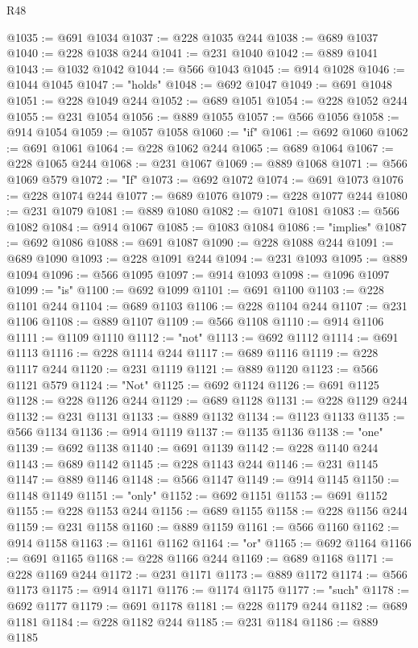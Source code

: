 \begin{lexlean}{R48}
\begin{coremodule}
@1035 := @691 @1034
@1037 := @228 @1035 @244
@1038 := @689 @1037
@1040 := @228 @1038 @244
@1041 := @231 @1040
@1042 := @889 @1041
@1043 := @1032 @1042
@1044 := @566 @1043
@1045 := @914 @1028
@1046 := @1044 @1045
@1047 := "holds"
@1048 := @692 @1047
@1049 := @691 @1048
@1051 := @228 @1049 @244
@1052 := @689 @1051
@1054 := @228 @1052 @244
@1055 := @231 @1054
@1056 := @889 @1055
@1057 := @566 @1056
@1058 := @914 @1054
@1059 := @1057 @1058
@1060 := "if"
@1061 := @692 @1060
@1062 := @691 @1061
@1064 := @228 @1062 @244
@1065 := @689 @1064
@1067 := @228 @1065 @244
@1068 := @231 @1067
@1069 := @889 @1068
@1071 := @566 @1069 @579
@1072 := "If"
@1073 := @692 @1072
@1074 := @691 @1073
@1076 := @228 @1074 @244
@1077 := @689 @1076
@1079 := @228 @1077 @244
@1080 := @231 @1079
@1081 := @889 @1080
@1082 := @1071 @1081
@1083 := @566 @1082
@1084 := @914 @1067
@1085 := @1083 @1084
@1086 := "implies"
@1087 := @692 @1086
@1088 := @691 @1087
@1090 := @228 @1088 @244
@1091 := @689 @1090
@1093 := @228 @1091 @244
@1094 := @231 @1093
@1095 := @889 @1094
@1096 := @566 @1095
@1097 := @914 @1093
@1098 := @1096 @1097
@1099 := "is"
@1100 := @692 @1099
@1101 := @691 @1100
@1103 := @228 @1101 @244
@1104 := @689 @1103
@1106 := @228 @1104 @244
@1107 := @231 @1106
@1108 := @889 @1107
@1109 := @566 @1108
@1110 := @914 @1106
@1111 := @1109 @1110
@1112 := "not"
@1113 := @692 @1112
@1114 := @691 @1113
@1116 := @228 @1114 @244
@1117 := @689 @1116
@1119 := @228 @1117 @244
@1120 := @231 @1119
@1121 := @889 @1120
@1123 := @566 @1121 @579
@1124 := "Not"
@1125 := @692 @1124
@1126 := @691 @1125
@1128 := @228 @1126 @244
@1129 := @689 @1128
@1131 := @228 @1129 @244
@1132 := @231 @1131
@1133 := @889 @1132
@1134 := @1123 @1133
@1135 := @566 @1134
@1136 := @914 @1119
@1137 := @1135 @1136
@1138 := "one"
@1139 := @692 @1138
@1140 := @691 @1139
@1142 := @228 @1140 @244
@1143 := @689 @1142
@1145 := @228 @1143 @244
@1146 := @231 @1145
@1147 := @889 @1146
@1148 := @566 @1147
@1149 := @914 @1145
@1150 := @1148 @1149
@1151 := "only"
@1152 := @692 @1151
@1153 := @691 @1152
@1155 := @228 @1153 @244
@1156 := @689 @1155
@1158 := @228 @1156 @244
@1159 := @231 @1158
@1160 := @889 @1159
@1161 := @566 @1160
@1162 := @914 @1158
@1163 := @1161 @1162
@1164 := "or"
@1165 := @692 @1164
@1166 := @691 @1165
@1168 := @228 @1166 @244
@1169 := @689 @1168
@1171 := @228 @1169 @244
@1172 := @231 @1171
@1173 := @889 @1172
@1174 := @566 @1173
@1175 := @914 @1171
@1176 := @1174 @1175
@1177 := "such"
@1178 := @692 @1177
@1179 := @691 @1178
@1181 := @228 @1179 @244
@1182 := @689 @1181
@1184 := @228 @1182 @244
@1185 := @231 @1184
@1186 := @889 @1185

\end{coremodule}
\end{lexlean}
